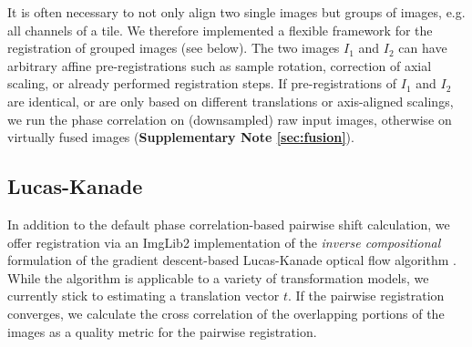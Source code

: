 It is often necessary to not only align two single images but groups of images, e.g. all channels of a tile. We therefore implemented a flexible framework for the registration of grouped images (see below). The two images $I_1$ and $I_2$ can have arbitrary affine pre-registrations such as sample rotation, correction of axial scaling, or already performed registration steps. If pre-registrations of $I_1$ and $I_2$ are identical, or are only based on different translations or axis-aligned scalings, we run the phase correlation on (downsampled) raw input images, otherwise on virtually fused images (\textbf{Supplementary Note \ref{sec:fusion}}).


%

\subsection*{Lucas-Kanade}

In addition to the default phase correlation-based pairwise shift calculation, we offer registration via an ImgLib2 implementation of the \emph{inverse compositional} formulation of the gradient descent-based Lucas-Kanade optical flow algorithm \cite{baker2004lucas}. While the algorithm is applicable to a variety of transformation models, we currently stick to estimating a translation vector $t$. If the pairwise registration converges, we calculate the cross correlation of the overlapping portions of the images as a quality metric for the pairwise registration. 

